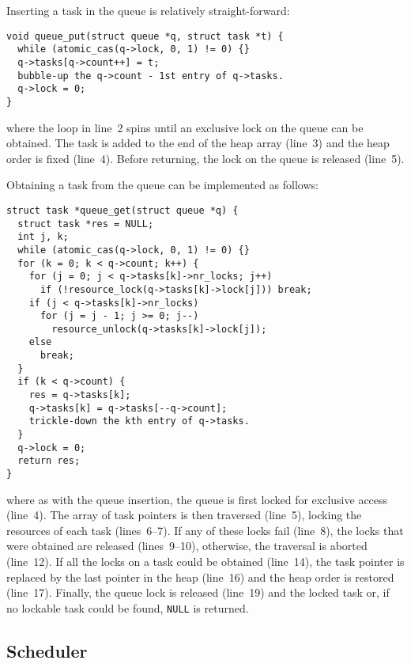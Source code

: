 \documentclass[preprint]{elsarticle}
\begin{document}
Inserting a task in the queue is relatively straight-forward:
\begin{center}\begin{minipage}{0.9\textwidth}
    \begin{lstlisting}
void queue_put(struct queue *q, struct task *t) {
  while (atomic_cas(q->lock, 0, 1) != 0) {}
  q->tasks[q->count++] = t;
  bubble-up the q->count - 1st entry of q->tasks.
  q->lock = 0;
}
    \end{lstlisting}
\end{minipage}\end{center}
\noindent where the loop in line~2 spins until an exclusive
lock on the queue can be obtained.
The task is added to the end of the heap array (line~3)
and the heap order is fixed (line~4).
Before returning, the lock on the queue is released (line~5).

Obtaining a task from the queue can be implemented as follows:
\begin{center}\begin{minipage}{0.9\textwidth}
    \begin{lstlisting}
struct task *queue_get(struct queue *q) {
  struct task *res = NULL;
  int j, k;
  while (atomic_cas(q->lock, 0, 1) != 0) {}
  for (k = 0; k < q->count; k++) {
    for (j = 0; j < q->tasks[k]->nr_locks; j++)
      if (!resource_lock(q->tasks[k]->lock[j])) break;
    if (j < q->tasks[k]->nr_locks)
      for (j = j - 1; j >= 0; j--)
        resource_unlock(q->tasks[k]->lock[j]);
    else
      break;
  }
  if (k < q->count) {
    res = q->tasks[k];
    q->tasks[k] = q->tasks[--q->count];
    trickle-down the kth entry of q->tasks.
  }
  q->lock = 0;
  return res;
}
    \end{lstlisting}
\end{minipage}\end{center}
\noindent where as with the queue insertion, the queue is first
locked for exclusive access (line~4).
The array of task pointers is then traversed (line~5),
locking the resources of each task (lines~6--7).
If any of these locks fail (line~8), the locks that were obtained
are released (lines~9--10), otherwise, the traversal is aborted
(line~12).
If all the locks on a task could be obtained (line~14), the
task pointer is replaced by the last pointer in the heap (line~16)
and the heap order is restored (line~17).
Finally, the queue lock is released (line~19) and the locked task
or, if no lockable task could be found, {\tt NULL} is returned.


\subsection{Scheduler}
\end{document}
